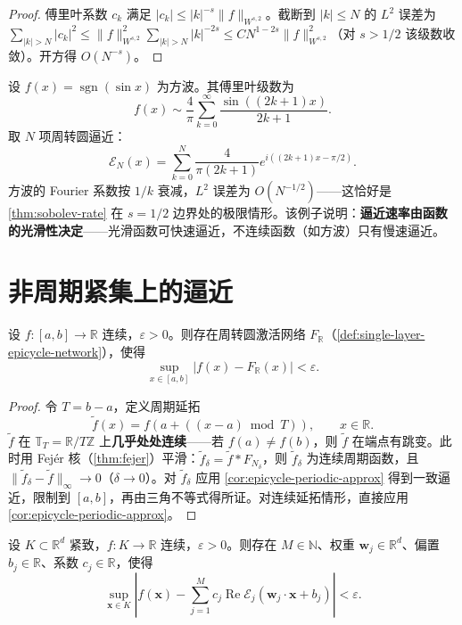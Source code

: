 \begin{proof}
傅里叶系数 $c_k$ 满足 $|c_k|\le |k|^{-s}\|f\|_{W^{s,2}}$。截断到 $|k|\le N$ 的 $L^2$ 误差为 $\sum_{|k|>N}|c_k|^2\le \|f\|_{W^{s,2}}^2\sum_{|k|>N}|k|^{-2s}\le C N^{1-2s}\|f\|_{W^{s,2}}^2$（对 $s>1/2$ 该级数收敛）。开方得 $O(N^{-s})$。
\end{proof}

\begin{example}[方波的周转圆逼近]\label{ex:square-wave-approx}
设 $f(x)=\operatorname{sgn}(\sin x)$ 为方波。其傅里叶级数为
\[
f(x)\sim \frac{4}{\pi}\sum_{k=0}^{\infty}\frac{\sin((2k+1)x)}{2k+1}.
\]
取 $N$ 项周转圆逼近：
\[
\mathcal E_N(x)=\sum_{k=0}^{N}\frac{4}{\pi(2k+1)}e^{i((2k+1)x-\pi/2)}.
\]
方波的 Fourier 系数按 $1/k$ 衰减，$L^2$ 误差为 $O(N^{-1/2})$——这恰好是 \cref{thm:sobolev-rate} 在 $s=1/2$ 边界处的极限情形。该例子说明：\textbf{逼近速率由函数的光滑性决定}——光滑函数可快速逼近，不连续函数（如方波）只有慢速逼近。
\end{example}

\section{非周期紧集上的逼近}

\begin{theorem}[紧区间上的实值逼近]\label{thm:compact-interval-approx}
设 $f:[a,b]\to\mathbb R$ 连续，$\varepsilon>0$。则存在周转圆激活网络 $F_{\mathbb R}$（\cref{def:single-layer-epicycle-network}），使得
\[
\sup_{x\in[a,b]}|f(x)-F_{\mathbb R}(x)|<\varepsilon.
\]
\end{theorem}

\begin{proof}
令 $T=b-a$，定义周期延拓
\[
\tilde f(x)=f\left(a+\left((x-a)\bmod T\right)\right),\qquad x\in\mathbb R.
\]
$\tilde f$ 在 $\mathbb T_T=\mathbb R/T\mathbb Z$ 上\textbf{几乎处处连续}——若 $f(a)\neq f(b)$，则 $\tilde f$ 在端点有跳变。此时用 Fejér 核（\cref{thm:fejer}）平滑：$\tilde f_\delta = \tilde f * F_{N_\delta}$，则 $\tilde f_\delta$ 为连续周期函数，且 $\|\tilde f_\delta - \tilde f\|_\infty\to 0$（$\delta\to0$）。对 $\tilde f_\delta$ 应用 \cref{cor:epicycle-periodic-approx} 得到一致逼近，限制到 $[a,b]$，再由三角不等式得所证。对连续延拓情形，直接应用 \cref{cor:epicycle-periodic-approx}。
\end{proof}

\begin{theorem}[单隐层万能逼近]\label{thm:universal-approx-epicycle}
设 $K\subset\mathbb R^d$ 紧致，$f:K\to\mathbb R$ 连续，$\varepsilon>0$。则存在 $M\in\mathbb N$、权重 $\mathbf w_j\in\mathbb R^d$、偏置 $b_j\in\mathbb R$、系数 $c_j\in\mathbb R$，使得
\[
\sup_{\mathbf x\in K}\left|f(\mathbf x)-\sum_{j=1}^{M}c_j\operatorname{Re}\mathcal E_j(\mathbf w_j\cdot\mathbf x+b_j)\right|<\varepsilon.
\]
\end{theorem}


